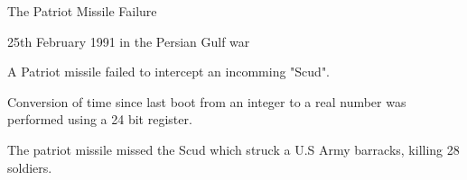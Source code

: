 \documentclass[13pt]{beamer}
\begin{document}
%

\begin{frame}{The Patriot Missile Failure}
  \begin{block}{}
    25th February 1991 in the Persian Gulf war
  \end{block}

  \pause

  \begin{block}{}
     A Patriot missile failed to intercept an incomming "Scud".
  \end{block}

  \pause

  \begin{block}{}
     Conversion of time since last boot from an integer to a real number was performed using a 24 bit register.
  \end{block}

  \pause

  \begin{block}{}
     The patriot missile missed the Scud which struck a U.S Army barracks, killing 28 soldiers.
  \end{block}

\end{frame}
\end{document}

